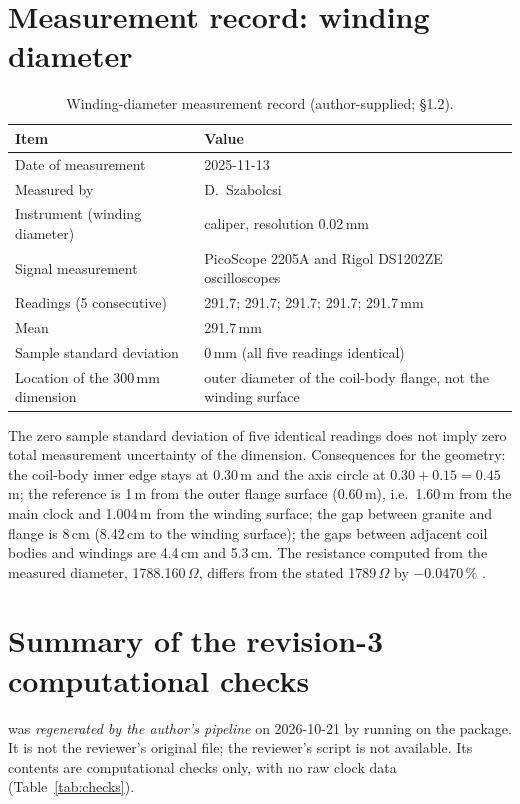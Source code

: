 \documentclass[12pt,a4paper]{article}
\newcommand{\filec}[1]{\texttt{\detokenize{#1}}}
\begin{document}
\section{Measurement record: winding diameter}\label{app:meas}
\begin{table}[h]
\centering
\caption{Winding-diameter measurement record (author-supplied; \filec{report_hu.md} \S1.2).}
\label{tab:meas}
\small
\begin{tabular}{ll}
\toprule
Item & Value\\
\midrule
Date of measurement & 2025-11-13\\
Measured by & D.\ Szabolcsi\\
Instrument (winding diameter) & caliper, resolution 0.02\,mm\\
Signal measurement & PicoScope 2205A and Rigol DS1202ZE oscilloscopes\\
Readings (5 consecutive) & 291.7; 291.7; 291.7; 291.7; 291.7\,mm\\
Mean & 291.7\,mm\\
Sample standard deviation & 0\,mm (all five readings identical)\\
Location of the 300\,mm dimension & outer diameter of the coil-body flange, not the winding surface\\
\bottomrule
\end{tabular}
\end{table}
\noindent The zero sample standard deviation of five identical readings does not imply zero total measurement uncertainty
of the dimension. Consequences for the geometry: the coil-body inner edge stays at 0.30\,m and the axis circle at
$0.30+0.15=0.45$\,m; the reference is 1\,m from the outer flange surface (0.60\,m), i.e.\ 1.60\,m from the main clock and
1.004\,m from the winding surface; the gap between granite and flange is 8\,cm (8.42\,cm to the winding surface); the gaps
between adjacent coil bodies and windings are 4.4\,cm and 5.3\,cm. The resistance computed from the measured diameter,
1788.160\,$\Omega$, differs from the stated 1789\,$\Omega$ by $-0.0470\,\%$ \cite{TAL_V20}.

\section{Summary of the revision-3 computational checks}\label{app:checks}
 was \emph{regenerated by the author's pipeline} on 2026-10-21 by running
 on the  package. It is not the reviewer's original file; the reviewer's
script  is not available. Its contents are computational checks only, with no raw clock data
(Table~\ref{tab:checks}).
\end{document}
